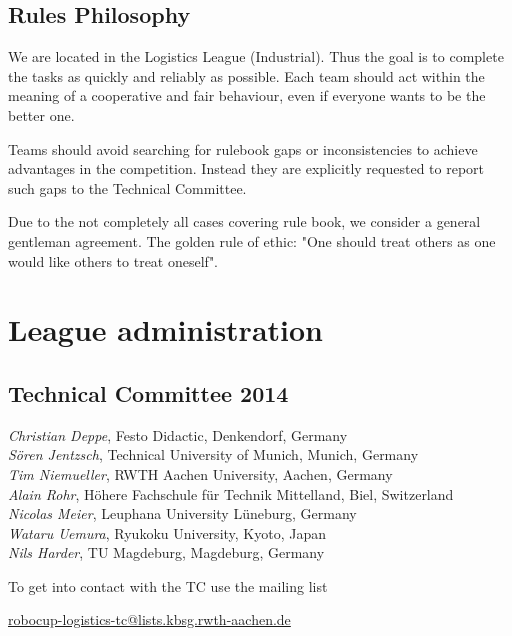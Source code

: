 \documentclass[12pt,twoside]{article}
\begin{document}
\subsection{Rules Philosophy}

We are located in the Logistics League (Industrial). Thus the goal is
to complete the tasks as quickly and reliably as possible. Each team
should act within the meaning of a cooperative and fair behaviour,
even if everyone wants to be the better one.

Teams should avoid searching for rulebook gaps or inconsistencies to
achieve advantages in the competition. Instead they are explicitly
requested to report such gaps to the Technical Committee.

Due to the not completely all cases covering rule book, we consider a
general gentleman agreement.  The golden rule of ethic: "One should
treat others as one would like others to treat oneself".


\section{League administration} \label{sec:commitees}
\subsection{Technical Committee 2014} \label{sec:tc}
\emph{Christian Deppe}, Festo Didactic, Denkendorf, Germany\\
\emph{S\"oren Jentzsch}, Technical University of Munich, Munich, Germany\\
\emph{Tim Niemueller}, RWTH Aachen University, Aachen, Germany\\
\emph{Alain Rohr}, Höhere Fachschule für Technik Mittelland, Biel, Switzerland\\
\emph{Nicolas Meier}, Leuphana University Lüneburg, Germany\\
\emph{Wataru Uemura}, Ryukoku University, Kyoto, Japan\\
\emph{Nils Harder}, TU Magdeburg, Magdeburg, Germany\\
\medskip

\noindent
To get into contact with the TC use the mailing list\\
\centerline{\url{robocup-logistics-tc@lists.kbsg.rwth-aachen.de}}
\end{document}
